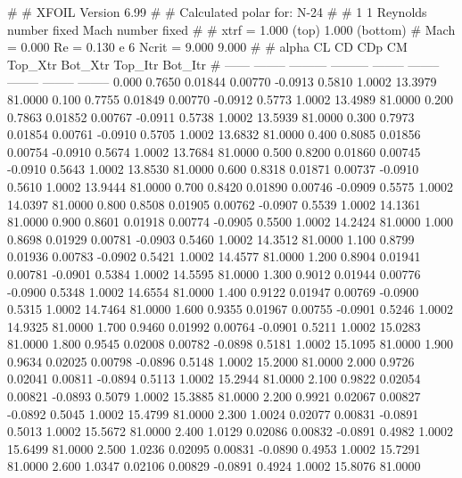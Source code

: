 #  
#       XFOIL         Version 6.99
#  
# Calculated polar for: N-24                                            
#  
# 1 1 Reynolds number fixed          Mach number fixed         
#  
# xtrf =   1.000 (top)        1.000 (bottom)  
# Mach =   0.000     Re =     0.130 e 6     Ncrit =   9.000  9.000
#  
#   alpha    CL        CD       CDp       CM     Top_Xtr  Bot_Xtr  Top_Itr  Bot_Itr
#  ------ -------- --------- --------- -------- -------- -------- -------- --------
   0.000   0.7650   0.01844   0.00770  -0.0913   0.5810   1.0002  13.3979  81.0000
   0.100   0.7755   0.01849   0.00770  -0.0912   0.5773   1.0002  13.4989  81.0000
   0.200   0.7863   0.01852   0.00767  -0.0911   0.5738   1.0002  13.5939  81.0000
   0.300   0.7973   0.01854   0.00761  -0.0910   0.5705   1.0002  13.6832  81.0000
   0.400   0.8085   0.01856   0.00754  -0.0910   0.5674   1.0002  13.7684  81.0000
   0.500   0.8200   0.01860   0.00745  -0.0910   0.5643   1.0002  13.8530  81.0000
   0.600   0.8318   0.01871   0.00737  -0.0910   0.5610   1.0002  13.9444  81.0000
   0.700   0.8420   0.01890   0.00746  -0.0909   0.5575   1.0002  14.0397  81.0000
   0.800   0.8508   0.01905   0.00762  -0.0907   0.5539   1.0002  14.1361  81.0000
   0.900   0.8601   0.01918   0.00774  -0.0905   0.5500   1.0002  14.2424  81.0000
   1.000   0.8698   0.01929   0.00781  -0.0903   0.5460   1.0002  14.3512  81.0000
   1.100   0.8799   0.01936   0.00783  -0.0902   0.5421   1.0002  14.4577  81.0000
   1.200   0.8904   0.01941   0.00781  -0.0901   0.5384   1.0002  14.5595  81.0000
   1.300   0.9012   0.01944   0.00776  -0.0900   0.5348   1.0002  14.6554  81.0000
   1.400   0.9122   0.01947   0.00769  -0.0900   0.5315   1.0002  14.7464  81.0000
   1.600   0.9355   0.01967   0.00755  -0.0901   0.5246   1.0002  14.9325  81.0000
   1.700   0.9460   0.01992   0.00764  -0.0901   0.5211   1.0002  15.0283  81.0000
   1.800   0.9545   0.02008   0.00782  -0.0898   0.5181   1.0002  15.1095  81.0000
   1.900   0.9634   0.02025   0.00798  -0.0896   0.5148   1.0002  15.2000  81.0000
   2.000   0.9726   0.02041   0.00811  -0.0894   0.5113   1.0002  15.2944  81.0000
   2.100   0.9822   0.02054   0.00821  -0.0893   0.5079   1.0002  15.3885  81.0000
   2.200   0.9921   0.02067   0.00827  -0.0892   0.5045   1.0002  15.4799  81.0000
   2.300   1.0024   0.02077   0.00831  -0.0891   0.5013   1.0002  15.5672  81.0000
   2.400   1.0129   0.02086   0.00832  -0.0891   0.4982   1.0002  15.6499  81.0000
   2.500   1.0236   0.02095   0.00831  -0.0890   0.4953   1.0002  15.7291  81.0000
   2.600   1.0347   0.02106   0.00829  -0.0891   0.4924   1.0002  15.8076  81.0000

